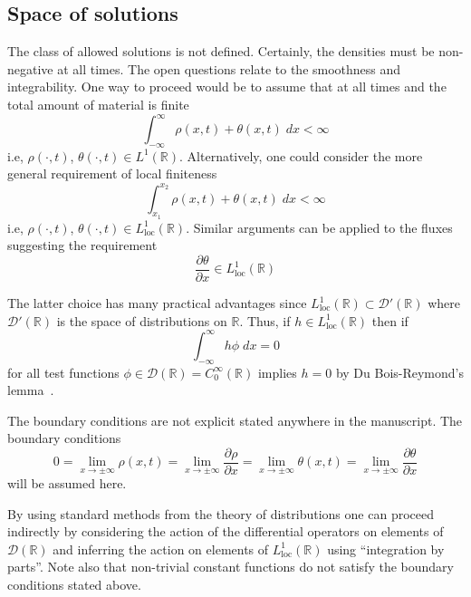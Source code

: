 \documentclass[12pt]{amsart}
\begin{document}
\subsection{Space of solutions}

The class of allowed solutions is not defined.  Certainly, the
densities must be non-negative at all times.  The open questions
relate to the smoothness and integrability.  One way to proceed would
be to assume that at all times and the total amount of material is
finite
\begin{equation}
  \int_{-\infty}^{\infty} \rho(x, t) + \theta(x, t) \; dx < \infty
\end{equation}
i.e, $\rho(\cdot, t)$, $\theta(\cdot, t) \in L^{1}(\mathbb{R})$.
Alternatively, one could consider the more general requirement of
local finiteness
\begin{equation}
  \int_{x_{1}}^{x_2} \rho(x, t) + \theta(x, t) \; dx < \infty
\end{equation}
i.e, $\rho(\cdot, t)$, $\theta(\cdot, t) \in
L^{1}_{\text{loc}}(\mathbb{R})$.
Similar arguments can be applied to the fluxes suggesting the
requirement
\begin{equation}
  \frac{\partial\theta}{\partial x} \in L^{1}_{\text{loc}}(\mathbb{R})
\end{equation}

The latter choice has many practical advantages since
$L^{1}_{\text{loc}}(\mathbb{R}) \subset \mathcal{D}'(\mathbb{R})$
where $\mathcal{D}'(\mathbb{R})$ is the space of distributions on
$\mathbb{R}$.  Thus, if $h\in L^{1}_{\text{loc}}(\mathbb{R})$ then if
\begin{equation}
  \int_{-\infty}^{\infty} h\phi \; dx = 0
\end{equation}
for all test functions $\phi\in \mathcal{D}(\mathbb{R}) =
C^{\infty}_{0}(\mathbb{R})$ implies $h=0$ by Du Bois-Reymond's
lemma~\cite{Grubb:2009}.

The boundary conditions are not explicit stated anywhere in the
manuscript.  The boundary conditions
\begin{equation}
  0 = 
  \lim_{x\rightarrow \pm\infty} \rho(x, t) =
  \lim_{x\rightarrow \pm\infty} \frac{\partial\rho}{\partial x} =  
  \lim_{x\rightarrow \pm\infty} \theta(x, t)  =  
  \lim_{x\rightarrow \pm\infty} \frac{\partial \theta}{\partial x}
\end{equation}
will be assumed here.  

By using standard methods from the theory of distributions one can
proceed indirectly by considering the action of the differential
operators on elements of $\mathcal{D}(\mathbb{R})$ and inferring the
action on elements of $L^{1}_{\text{loc}}(\mathbb{R})$ using
``integration by parts''.  Note also that non-trivial constant
functions do not satisfy the boundary conditions stated above.
\end{document}
